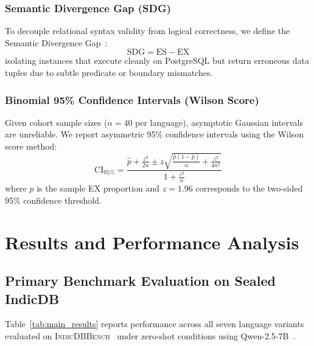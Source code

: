 \documentclass[conference]{IEEEtran}
\begin{document}
\subsubsection{Semantic Divergence Gap (SDG)}
To decouple relational syntax validity from logical correctness, we define the Semantic Divergence Gap~\cite{pourreza2023dinsql,wang2024macsql}:
\begin{equation}
    \text{SDG} = \text{ES} - \text{EX}
\end{equation}
isolating instances that execute cleanly on PostgreSQL but return erroneous data tuples due to subtle predicate or boundary mismatches.

\subsubsection{Binomial 95\% Confidence Intervals (Wilson Score)}
Given cohort sample sizes ($n = 40$ per language), asymptotic Gaussian intervals are unreliable. We report asymmetric 95\% confidence intervals using the Wilson score method:
\begin{equation}
    \text{CI}_{95\%} = \frac{\hat{p} + \frac{z^2}{2n} \pm z \sqrt{\frac{\hat{p}(1-\hat{p})}{n} + \frac{z^2}{4n^2}}}{1 + \frac{z^2}{n}}
\end{equation}
where $\hat{p}$ is the sample EX proportion and $z = 1.96$ corresponds to the two-sided 95\% confidence threshold.

\section{Results and Performance Analysis}\label{sec:results}

\subsection{Primary Benchmark Evaluation on Sealed IndicDB}
Table~\ref{tab:main_results} reports performance across all seven language variants evaluated on \textsc{IndicDBBench}~\cite{dawar2026indicdbbench} under zero-shot conditions using Qwen-2.5-7B~\cite{qwen2024qwen2.5}.
\end{document}

